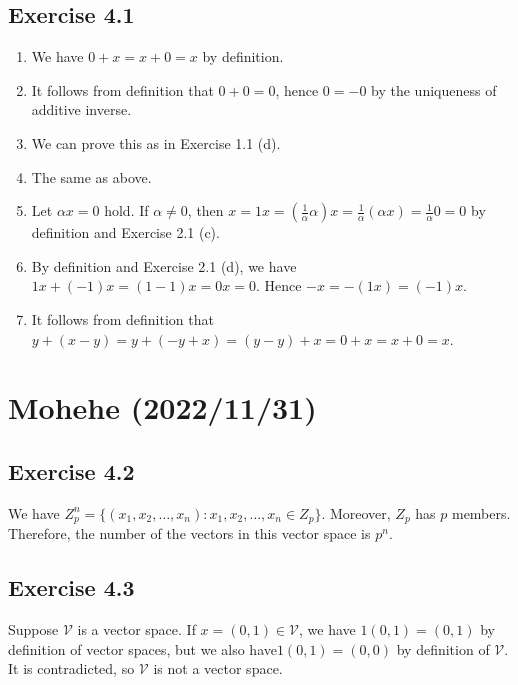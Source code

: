 \documentclass{article}
\theoremstyle{thmstyleone}
\theoremstyle{thmstyletwo}
\theoremstyle{thmstylethree}
\begin{document}
\subsection{Exercise 4.1}
\begin{enumerate}[label = (\alph*)]
\item We have $0+x = x+0 = x$ by definition.
\item It follows from definition that $0+0=0$, hence $0 = -0$ by the uniqueness of additive inverse.
\item We can prove this as in Exercise 1.1 (d).
\item The same as above.
\item Let $\alpha x = 0$ hold.
If $\alpha \ne 0$, then $x = 1x = (\frac{1}{\alpha}\alpha)x = \frac{1}{\alpha} (\alpha x) = \frac{1}{\alpha}0 = 0$ by definition and Exercise 2.1 (c).
\item By definition and Exercise 2.1 (d), we have $1x + (-1)x = (1-1)x  = 0x =0$.
Hence $-x = -(1x) = (-1)x$.
\item It follows from definition that $y + (x-y) = y + (-y + x) = (y - y) + x = 0 + x =x + 0 = x$.
\end{enumerate}

\section{Mohehe (2022/11/31)}
\newcommand \V{\mathcal V}
\newcommand \PP{\mathcal P}
\subsection{Exercise 4.2}
We have $Z_p^n = \{(x_1,x_2, \dots , x_n):x_1,x_2,\dots,x_n \in Z_p\}$.
Moreover, $Z_p$ has $p$ members.
Therefore, the number of  the vectors in this vector space is $p^n$.

\subsection{Exercise 4.3}
Suppose $\V$ is a vector space.
If $x = (0,1) \in \V$, we have $1(0,1) = (0,1)$ by definition of vector spaces, but we also have$1(0,1) = (0,0)$ by definition of $\V$. It is contradicted, so $\V$ is not a vector space.
\end{document}
